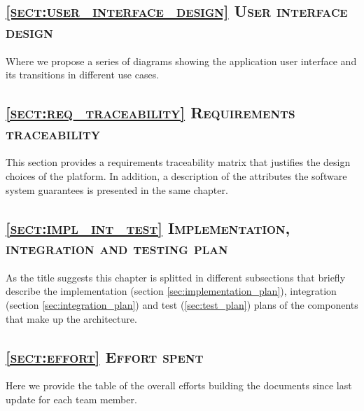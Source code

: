 \subsection*{\textsc{\textcolor{myblue}{\ref{sect:user_interface_design} User interface design}}}
Where we propose a series of diagrams showing the application user interface and its transitions in different use cases.

\subsection*{\textsc{\textcolor{myblue}{\ref{sect:req_traceability} Requirements traceability}}}
This section provides a requirements traceability matrix that justifies the design choices of the platform. In addition, a description of the attributes the software system guarantees is presented in the same chapter.

\subsection*{\textsc{\textcolor{myblue}{\ref{sect:impl_int_test} Implementation, integration and testing plan}}}
As the title suggests this chapter is splitted in different subsections that briefly describe the implementation (section \ref{sec:implementation_plan}), integration (section \ref{sec:integration_plan}) and test (\ref{sec:test_plan}) plans of the components that make up the architecture.

\subsection*{\textsc{\textcolor{myblue}{\ref{sect:effort} Effort spent}}}
Here we provide the table of the overall efforts building the documents since last update for each team member.
